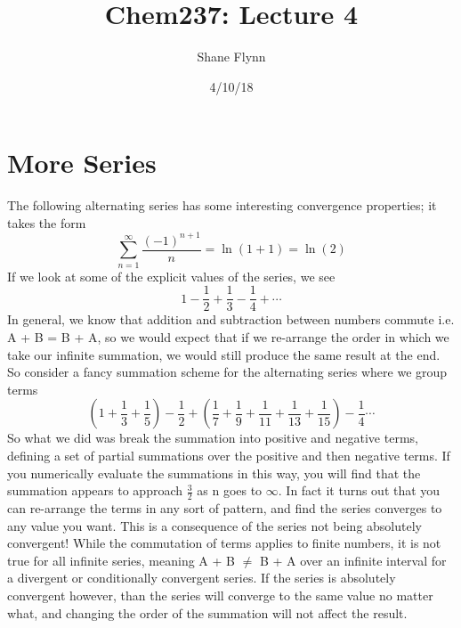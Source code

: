 \documentclass{article}
\title{Chem237: Lecture 4}
\date{4/10/18}
\author{Shane Flynn}
\newcommand{\be}{\begin{equation}}
\newcommand{\ee}{\end{equation}}
\newcommand{\sumone}{\sum_{n=1}^\infty}
\begin{document}
\maketitle
\section*{More Series}
The following alternating series has some interesting convergence properties; it takes the form
\be
\sumone \frac{(-1)^{n+1}}{n} = \ln (1+1) = \ln (2)
\ee
If we look at some of the explicit values of the series, we see
\be
1 - \frac{1}{2} + \frac{1}{3} - \frac{1}{4} + \cdots
\ee
In general, we know that addition and subtraction between numbers commute i.e. A + B = B + A, so we would expect that if we re-arrange the order in which we take our infinite summation, we would still produce the same result at the end.
So consider a fancy summation scheme for the alternating series where we group terms
\be
\left(1 + \frac{1}{3} + \frac{1}{5}\right) - \frac{1}{2} + \left(\frac{1}{7} + \frac{1}{9} + \frac{1}{11} + \frac{1}{13} + \frac{1}{15}\right) - \frac{1}{4} \cdots
\ee
So what we did was break the summation into positive and negative terms, defining a set of partial summations over the positive and then negative terms.
If you numerically evaluate the summations in this way, you will find that the summation appears to approach $\frac{3}{2}$ as n goes to $\infty$.
In fact it turns out that you can re-arrange the terms in any sort of pattern, and find the series converges to any value you want.
This is a consequence of the series not being absolutely convergent!
While the commutation of terms applies to finite numbers, it is not true for all infinite series, meaning A + B $\neq$ B + A over an infinite interval for a divergent or conditionally convergent series.
If the series is absolutely convergent however, than the series will converge to the same value no matter what, and changing the order of the summation will not affect the result.
\end{document}
